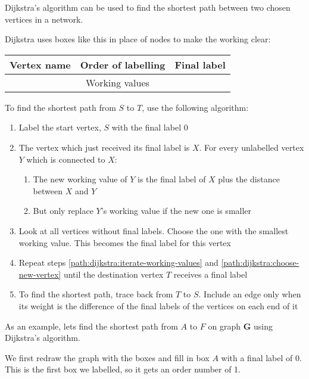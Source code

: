 \documentclass[../main.tex]{subfile}
\begin{document}

Dijkstra's algorithm can be used to find the shortest path between two chosen vertices in a network.

Dijkstra uses boxes like this in place of nodes to make the working clear:

\begin{center}
\begin{tabular}{|c|c|c|}
	\hline
	Vertex name & Order of labelling & Final label\\
	\hline
	\multicolumn{3}{|c|}{Working values}\\
	\hline
\end{tabular}
\end{center}

To find the shortest path from $S$ to $T$, use the following algorithm:

\begin{enumerate}
	\item Label the start vertex, $S$ with the final label 0
	\item\label{path:dijkstra:iterate-working-values} The vertex which just received its final label is $X$. For every unlabelled vertex $Y$ which is connected to $X$: \begin{enumerate}
			\item The new working value of $Y$ is the final label of $X$ plus the distance between $X$ and $Y$
			\item But only replace $Y$'s working value if the new one is smaller
	\end{enumerate}
	\item\label{path:dijkstra:choose-new-vertex} Look at all vertices without final labels. Choose the one with the smallest working value. This becomes the final label for this vertex
	\item Repeat steps \ref{path:dijkstra:iterate-working-values} and \ref{path:dijkstra:choose-new-vertex} until the destination vertex $T$ receives a final label
	\item To find the shortest path, trace back from $T$ to $S$. Include an edge only when its weight is the difference of the final labels of the vertices on each end of it
\end{enumerate}

As an example, lets find the shortest path from $A$ to $F$ on graph $\mathbf{G}$ using Dijkstra's algorithm.

We first redraw the graph with the boxes and fill in box $A$ with a final label of 0. This is the first box we labelled, so it gets an order number of 1.
\end{document}
